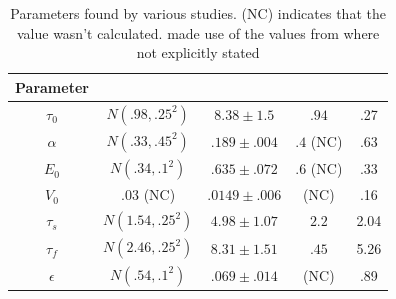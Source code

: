 
\begin{table}[t]
\centering
\begin{tabular}{|c || c | c | c | c|}
\hline 
Parameter  & \cite{Friston2000} & \cite{Johnston2008} & \cite{Vakorin2007} & \cite{Deneux2006}\\
\hline
$\tau_0  $ &  $N(.98 , .25^2)$  & $8.38 \pm 1.5  $ & $.94$ & .27\\
$\alpha  $ &  $N(.33 , .45^2)$  & $.189 \pm .004 $ & $.4$ (NC) & .63 \\
$E_0     $ &  $N(.34 , .1 ^2)$  & $.635 \pm .072 $ & $.6$ (NC) & .33\\
$V_0     $ &  $.03$ (NC)        & $.0149 \pm .006$ & (NC) & .16\\
$\tau_s  $ &  $N(1.54, .25^2)$  & $4.98 \pm 1.07 $ & $2.2$ & 2.04 \\
$\tau_f  $ &  $N(2.46, .25^2)$  & $8.31 \pm 1.51 $ & $.45$ & 5.26\\
$\epsilon$ &  $N(.54 , .1 ^2)$  & $.069 \pm .014 $ & (NC) & .89\\
\hline
\end{tabular}
\caption{Parameters found by various studies. (NC) indicates that the value
wasn't calculated. \cite{Vakorin2007} made use of the values from \cite{Friston2002}
where not explicitly stated}
\label{tab:Params} 
\end{table}

